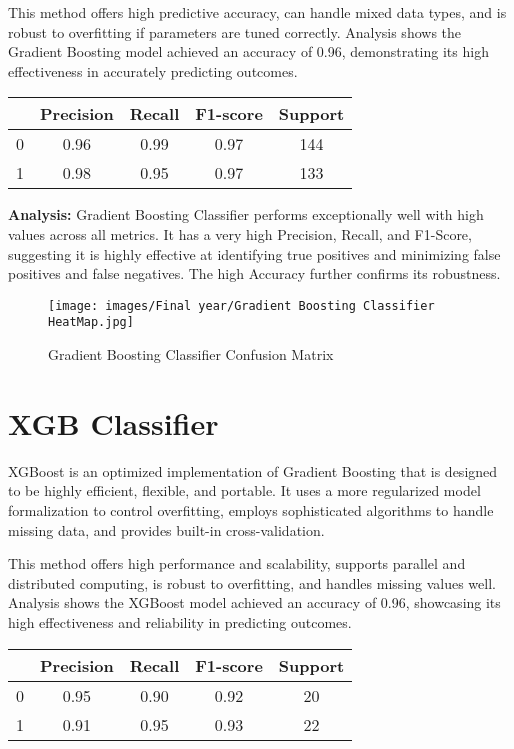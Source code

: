 \documentclass{report}
\begin{document}
{This method offers high predictive accuracy, can handle mixed data types, and is robust to overfitting if parameters are tuned correctly. Analysis shows the Gradient Boosting model achieved an accuracy of 0.96, demonstrating its high effectiveness in accurately predicting outcomes.

\begin{center}
\begin{tabular}{|c|c|c|c|c|}
  \hline
   & Precision & Recall & F1-score & Support \\
  \hline
  0 & 0.96 & 0.99 & 0.97 & 144 \\
  1 & 0.98 & 0.95 & 0.97 & 133 \\
  \hline
\end{tabular}
\end{center}

\textbf{Analysis: } Gradient Boosting Classifier performs exceptionally well with high values across all metrics. It has a very high Precision, Recall, and F1-Score, suggesting it is highly effective at identifying true positives and minimizing false positives and false negatives. The high Accuracy further confirms its robustness.
\vspace{1cm}
    \begin{figure}[h!]
    \centering
        \texttt{[image: images/Final year/Gradient Boosting Classifier HeatMap.jpg]} %
        \caption{Gradient Boosting Classifier Confusion Matrix}
    \end{figure}
\section{XGB Classifier}
XGBoost is an optimized implementation of Gradient Boosting that is designed to be highly efficient, flexible, and portable. It uses a more regularized model formalization to control overfitting, employs sophisticated algorithms to handle missing data, and provides built-in cross-validation.

This method offers high performance and scalability, supports parallel and distributed computing, is robust to overfitting, and handles missing values well. Analysis shows the XGBoost model achieved an accuracy of 0.96, showcasing its high effectiveness and reliability in predicting outcomes.

\begin{center}
\begin{tabular}{|c|c|c|c|c|}
  \hline
   & Precision & Recall & F1-score & Support \\
  \hline
  0 & 0.95 & 0.90 & 0.92 & 20 \\
  1 & 0.91 & 0.95 & 0.93 & 22 \\
  \hline
\end{tabular}
\end{center}

}
\end{document}
